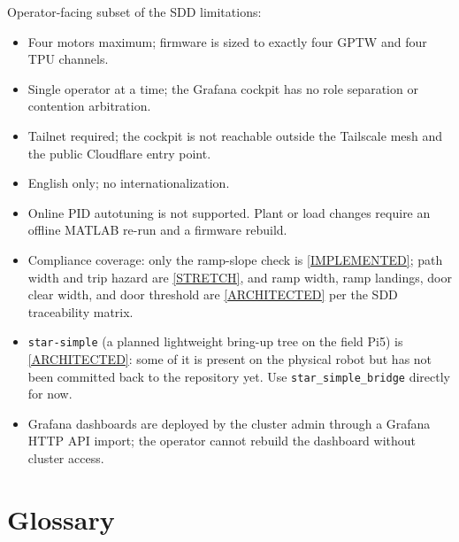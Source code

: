 \documentclass[11pt,letterpaper]{article}
\newcommand{\statuslabel}[1]{\hyperref[sec:status-legend]{[#1]}}
\begin{document}
Operator-facing subset of the SDD limitations:
\begin{itemize}[leftmargin=1.4em,itemsep=2pt]
\item Four motors maximum; firmware is sized to exactly four GPTW
      and four TPU channels.
\item Single operator at a time; the Grafana cockpit has no role
      separation or contention arbitration.
\item Tailnet required; the cockpit is not reachable outside the
      Tailscale mesh and the public Cloudflare entry point.
\item English only; no internationalization.
\item Online PID autotuning is not supported. Plant or load changes
      require an offline MATLAB re-run and a firmware rebuild.
\item Compliance coverage: only the ramp-slope check is
      \statuslabel{IMPLEMENTED}; path width and trip hazard are
      \statuslabel{STRETCH}, and ramp width, ramp landings, door
      clear width, and door threshold are \statuslabel{ARCHITECTED}
      per the SDD traceability matrix.
\item \texttt{star-simple} (a planned lightweight bring-up tree on
      the field Pi5) is \statuslabel{ARCHITECTED}: some of it is present on the
      physical robot but has not been committed back to the
      repository yet. Use \texttt{star\_simple\_bridge} directly
      for now.
\item Grafana dashboards are deployed by the cluster admin through
      a Grafana HTTP API import; the operator cannot rebuild the
      dashboard without cluster access.
\end{itemize}

\section{Glossary}
\label{sec:glossary}
\end{document}
